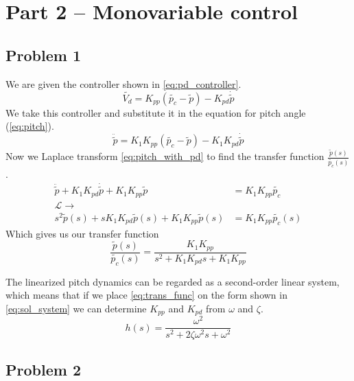 
\section{Part 2 -- Monovariable control}
\subsection{Problem 1}
We are given the controller shown in \cref{eq:pd_controller}.
\begin{equation}
  \label{eq:pd_controller}
  \tilde{V_d} = K_{pp}(\tilde{p_c} - \tilde{p}) - K_{pd} \dot{\tilde{p}}
\end {equation}
We take this controller and substitute it in the equation for pitch
angle (\cref{eq:pitch}).
\begin{equation}
  \label{eq:pitch_with_pd}
  \ddot{\tilde{p}} = K_1 K_{pp}(\tilde{p_c} - \tilde{p}) - K_1 K_{pd}
  \dot{\tilde{p}}
\end{equation}
Now we Laplace transform \cref{eq:pitch_with_pd} to find the transfer
function $\frac{\tilde{p}(s)}{\tilde{p_c}(s)}$.
\begin{align*}
  \ddot{\tilde{p}} + K_1 K_{pd}\dot{\tilde{p}}
  + K_1K_{pp}\tilde{p} &= K_1 K_{pp}\tilde{p_c} \\
  \mathcal{L}\rightarrow&  \\
  s^2\tilde{p}(s) + sK_1K_{pd}\tilde{p}(s)
  + K_1K_{pp}\tilde{p}(s) &= K_1K_{pp}\tilde{p_c}(s)
\end{align*}
Which gives us our transfer function
\begin{equation}
  \label{eq:trans_func}
  \frac{\tilde{p}(s)}{\tilde{p_c}(s)} = \frac{K_1K_{pp}}{s^2+K_1K_{pd}s+K_1K_{pp}}
\end{equation}

The linearized pitch dynamics can be regarded as a second-order linear
system, which means that if we place \cref{eq:trans_func} on the form
shown in \cref{eq:sol_system} we can determine $K_{pp}$ and $K_{pd}$
from $\omega$ and $\zeta$.
\begin{equation}
  \label{eq:sol_system}
  h(s) = \frac{\omega^2}{s^2+2\zeta\omega^2s+\omega^2}
\end{equation}



\subsection{Problem 2}
